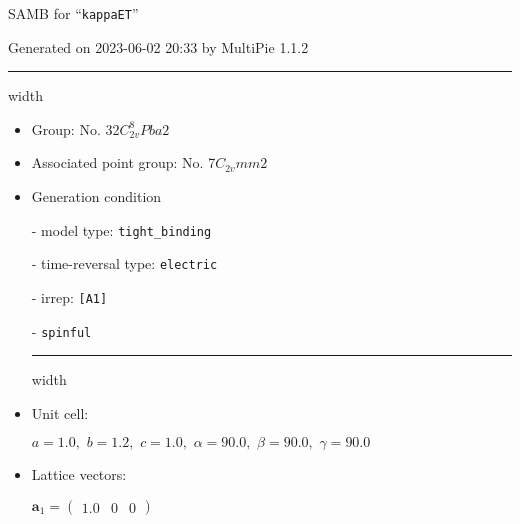 \documentclass[fleqn,10pt,landscape]{article}
\begin{document}
\setcounter{MaxMatrixCols}{16}

\setlength{\baselineskip}{16pt}
\footnotesize
\begin{center}
\LARGE
SAMB for ``\texttt{kappaET}''
\end{center}
\begin{flushright}
Generated on 2023-06-02 20:33 by MultiPie 1.1.2
\end{flushright}
\vspace{1cm}


 \hfil \hrule height 1mm width \textwidth \hfil

\begin{itemize}
\item Group: No. 32\quad$C_{2v}^{8}$\quad$Pba2$\quad[ orthorhombic ]

\item Associated point group: No. 7\quad$C_{2v}$\quad$mm2$\quad[ orthorhombic ]

\vspace{5mm}

\item Generation condition

\quad - model type: \texttt{tight_binding}

\quad - time-reversal type: \texttt{electric}

\quad - irrep: \texttt{[A1]}

\quad - \texttt{spinful}


 \hfil \hrule height 1mm width \textwidth \hfil

\item Unit cell:

\quad $a=1.0,\,\, b=1.2,\,\, c=1.0,\,\, \alpha=90.0,\,\, \beta=90.0,\,\, \gamma=90.0$

\item Lattice vectors:

\quad $\bm{a}_1=\begin{pmatrix} 1.0 & 0 & 0 \end{pmatrix}$


\end{itemize}
\end{document}
